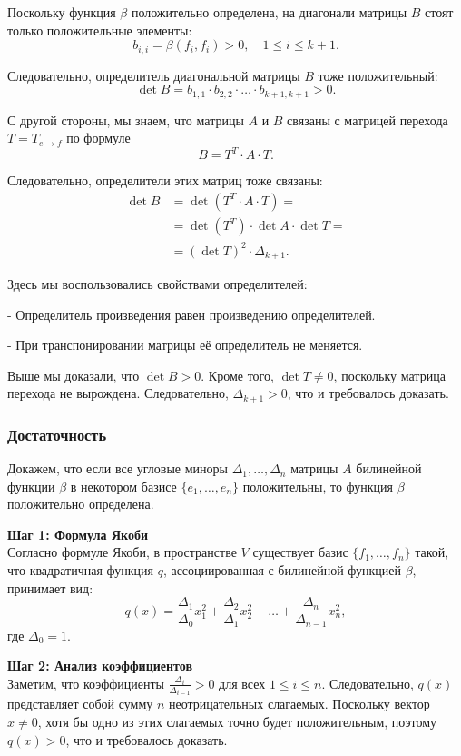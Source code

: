 \documentclass[12pt]{article}
\begin{document}
Поскольку функция $\beta$ положительно определена, на диагонали матрицы $B$ стоят только положительные элементы:
\[
b_{i,i} = \beta(f_i, f_i) > 0, \quad 1 \leq i \leq k+1.
\]

Следовательно, определитель диагональной матрицы $B$ тоже положительный:
\[
\det B = b_{1,1} \cdot b_{2,2} \cdot \ldots \cdot b_{k+1,k+1} > 0.
\]

С другой стороны, мы знаем, что матрицы $A$ и $B$ связаны с матрицей перехода $T = T_{e \to f}$ по формуле
\[
B = T^T \cdot A \cdot T.
\]

Следовательно, определители этих матриц тоже связаны:
\begin{align*}
\det B &= \det(T^T \cdot A \cdot T) = \\
&= \det(T^T) \cdot \det A \cdot \det T = \\
&= (\det T)^2 \cdot \Delta_{k+1}.
\end{align*}

Здесь мы воспользовались свойствами определителей:

    
- Определитель произведения равен произведению определителей.
    
- При транспонировании матрицы её определитель не меняется.


Выше мы доказали, что $\det B > 0$. Кроме того, $\det T \neq 0$, поскольку матрица перехода не вырождена. Следовательно, $\Delta_{k+1} > 0$, что и требовалось доказать.


\subsubsection*{Достаточность}
Докажем, что если все угловые миноры $\Delta_1, \dots, \Delta_n$ матрицы $A$ билинейной функции $\beta$ в некотором базисе $\{e_1, \dots, e_n\}$ положительны, то функция $\beta$ положительно определена.

\textbf{Шаг 1: Формула Якоби} \\
Согласно формуле Якоби, в пространстве $V$ существует базис $\{f_1, \dots, f_n\}$ такой, что квадратичная функция $q$, ассоциированная с билинейной функцией $\beta$, принимает вид:
\[
q(x) = \frac{\Delta_1}{\Delta_0} x_1^2 + \frac{\Delta_2}{\Delta_1} x_2^2 + \ldots + \frac{\Delta_n}{\Delta_{n-1}} x_n^2,
\]
где $\Delta_0 = 1$.

\textbf{Шаг 2: Анализ коэффициентов} \\
Заметим, что коэффициенты $\frac{\Delta_i}{\Delta_{i-1}} > 0$ для всех $1 \leq i \leq n$. Следовательно, $q(x)$ представляет собой сумму $n$ неотрицательных слагаемых. Поскольку вектор $x \neq 0$, хотя бы одно из этих слагаемых точно будет положительным, поэтому $q(x) > 0$, что и требовалось доказать.
\end{document}
